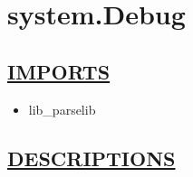 \chapter*{system.Debug}
\hypertarget{ecldoc:toc:system.Debug}{}

\section*{\underline{IMPORTS}}
\begin{itemize}
\item lib\_parselib
\end{itemize}

\section*{\underline{DESCRIPTIONS}}

